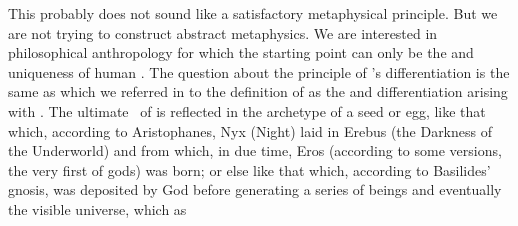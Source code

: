 \pa This probably does not sound like a satisfactory metaphysical principle. But
we are not trying to construct abstract metaphysics. We are interested in
philosophical anthropology for which the starting point can only be the
 and uniqueness of human . The question about the
principle of 's differentiation is the same as  which we referred in  to
the definition of  as the  and 
differentiation arising with .
The ultimate \nexus\ of  is reflected in the archetype of a seed or
egg, like that which, according to Aristophanes, {Nyx}
(Night) laid in {Erebus} (the Darkness of the Underworld) and from which, in due
time, {Eros} (according to some versions, the very first of gods) was born; or
else like that which, according to Basilides' gnosis, was deposited by God
before generating a series of beings and eventually the visible universe, which
as 

